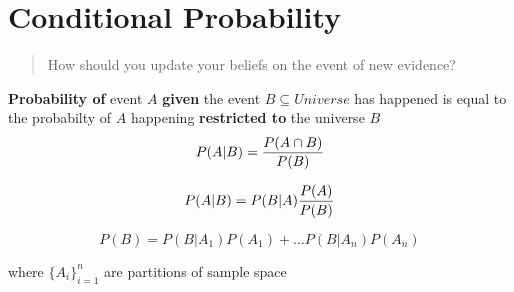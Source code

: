 \section{Conditional Probability}
\begin{slide}
  \begin{quote}
     How should you update your beliefs on the event of new evidence?
  \end{quote}
  \textbf{Probability of} event $A$ \textbf{given} the event $B\subseteq Universe$ has happened is equal to the probabilty of $A$ happening \textbf{restricted to} the universe $B$
	$$P(A|B) = {P(A\cap B) \over P(B)}$$

\end{slide}
\begin{slide}
\begin{shaded}
  $$P(A|B) = P(B|A){P(A) \over P(B)}$$
\end{shaded}
\end{slide}
\begin{slide}
\vspace{-1cm}
\begin{shaded}
  $$P(B) = P(B|A_1)P(A_1)+\ldots P(B|A_n)P(A_n)$$
\end{shaded}
where $\{A_i\}_{i=1}^n$ are partitions of sample space
\end{slide}
